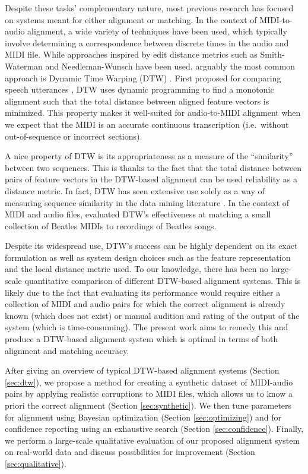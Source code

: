 \documentclass{article}
\begin{document}
Despite these tasks' complementary nature, most previous research has focused on systems meant for either alignment or matching.
In the context of MIDI-to-audio alignment, a wide variety of techniques have been used, which typically involve determining a correspondence between discrete times in the audio and MIDI file.
While approaches inspired by edit distance metrics such as Smith-Waterman \cite{ewert2012towards} and Needleman-Wunsch \cite{grachten2013automatic} have been used, arguably the most common approach is Dynamic Time Warping (DTW) \cite{muller2007dynamic}.
First proposed for comparing speech utterances \cite{sakoe1978dynamic}, DTW uses dynamic programming to find a monotonic alignment such that the total distance between aligned feature vectors is minimized.
This property makes it well-suited for audio-to-MIDI alignment when we expect that the MIDI is an accurate continuous transcription (i.e.\ without out-of-sequence or incorrect sections).

A nice property of DTW is its appropriateness as a measure of the ``similarity'' between two sequences.
This is thanks to the fact that the total distance between pairs of feature vectors in the DTW-based alignment can be used reliability as a distance metric.
In fact, DTW has seen extensive use solely as a way of measuring sequence similarity in the data mining literature \cite{berndt1994using}.
In the context of MIDI and audio files, \cite{hu2003polyphonic} evaluated DTW's effectiveness at matching a small collection of Beatles MIDIs to recordings of Beatles songs.

Despite its widespread use, DTW's success can be highly dependent on its exact formulation as well as system design choices such as the feature representation and the local distance metric used.
To our knowledge, there has been no large-scale quantitative comparison of different DTW-based alignment systems.
This is likely due to the fact that evaluating its performance would require either a collection of MIDI and audio pairs for which the correct alignment is already known (which does not exist) or manual audition and rating of the output of the system (which is time-consuming).
The present work aims to remedy this and produce a DTW-based alignment system which is optimal in terms of both alignment and matching accuracy.

After giving an overview of typical DTW-based alignment systems (Section \ref{sec:dtw}), we propose a method for creating a synthetic dataset of MIDI-audio pairs by applying realistic corruptions to MIDI files, which allows us to know a priori the correct alignment (Section \ref{sec:synthetic}).
We then tune parameters for alignment using Bayesian optimization (Section \ref{sec:optimizing}) and for confidence reporting using an exhaustive search (Section \ref{sec:confidence}).
Finally, we perform a large-scale qualitative evaluation of our proposed alignment system on real-world data and discuss possibilities for improvement (Section \ref{sec:qualitative}).
\end{document}
